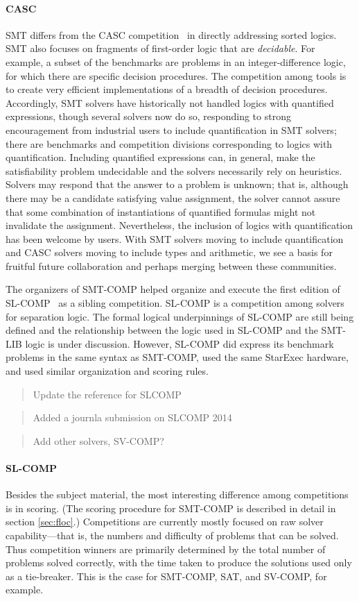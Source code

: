 \documentclass[twoside,11pt]{article}
\newcommand{\comment}[2]{\begin{quote}\sc #1\marginpar{\textcolor{red}{$\ast^{\mbox{#2}}$}}\end{quote}}
\newcommand{\davidd}[1]{\comment{#1}{DD}}
\newcommand{\davidc}[1]{\comment{#1}{DC}}
\begin{document}
\paragraph{CASC} SMT differs from the CASC competition~\cite{PSS02} in directly addressing sorted logics. SMT also focuses on fragments of first-order logic that are \emph{decidable}. For example, a subset of the benchmarks are problems in an integer-difference logic, for which there are specific decision procedures. The competition among tools is to create very efficient implementations of a breadth of decision procedures. Accordingly, SMT solvers have historically not handled logics with quantified expressions, though several solvers now do so, responding to strong encouragement from industrial users to include quantification in SMT solvers; there are benchmarks and competition divisions corresponding to logics with quantification. Including quantified expressions can, in general, make the satisfiability problem undecidable and the solvers necessarily rely on heuristics. Solvers may respond that the answer to a problem is unknown; that is, although there may be a candidate satisfying value assignment, the solver cannot assure that some combination of instantiations of quantified formulas might not invalidate the assignment.
Nevertheless, the inclusion of logics with quantification has been welcome by users. With SMT solvers moving to include quantification and CASC solvers moving to include types and arithmetic, we see a basis for fruitful future collaboration and perhaps merging between these communities.

The organizers of SMT-COMP helped organize and execute the first edition of SL-COMP~\cite{SLCOMP,sighireanu2014report} as a sibling competition. SL-COMP is a competition among solvers for separation logic. The formal logical underpinnings of SL-COMP are still being 
defined and the relationship between the logic used in SL-COMP and the SMT-LIB logic is under discussion. However, SL-COMP
did express its benchmark problems in the same syntax as SMT-COMP, used the same StarExec hardware, and used similar 
organization and scoring rules. 

\davidc{Update the reference for SLCOMP}
\davidd{Added a journla submission on SLCOMP 2014}
\davidc{Add other solvers, SV-COMP?}

\paragraph{SL-COMP} Besides the subject material, the most interesting difference among competitions is in scoring. (The scoring procedure for
SMT-COMP is described in detail in section \ref{sec:floc}.)
Competitions are currently mostly focused on raw solver capability---that is, the numbers and difficulty of problems that can be solved. Thus competition winners are primarily determined by the total number of problems solved correctly,
with the time taken to produce the solutions used only as a tie-breaker. This is the case for SMT-COMP, SAT, and SV-COMP,
for example.
\end{document}
